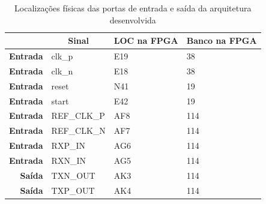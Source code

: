 \documentclass[11pt,a4paper]{article}
\begin{document}
	\begin{table}[h!]
		\centering
		\caption[Localizações físicas das portas de entrada e saída da arquitetura desenvolvida]{Localizações físicas das portas de entrada e saída da arquitetura desenvolvida}
		\label{table:loc_planD_simples}
		\begin{tabular}{rlll}
			\hline
			\multicolumn{1}{l}{}                  & \multicolumn{1}{c}{\textbf{Sinal}} & \multicolumn{1}{c}{\textbf{LOC na FPGA}} & \multicolumn{1}{c}{\textbf{Banco na FPGA}} \\ \hline
			\multicolumn{1}{r|}{\textbf{Entrada}} & clk\_p                             & E19                                      & 38                                         \\
			\multicolumn{1}{r|}{\textbf{Entrada}} & clk\_n                             & E18                                      & 38                                         \\
			\multicolumn{1}{r|}{\textbf{Entrada}} & reset                              & N41                                      & 19                                         \\
			\multicolumn{1}{r|}{\textbf{Entrada}} & start                              & E42                                      & 19                                         \\
			\multicolumn{1}{r|}{\textbf{Entrada}} & REF\_CLK\_P                        & AF8                                      & 114                                        \\
			\multicolumn{1}{r|}{\textbf{Entrada}} & REF\_CLK\_N                        & AF7                                      & 114                                        \\
			\multicolumn{1}{r|}{\textbf{Entrada}} & RXP\_IN                            & AG6                                      & 114                                        \\
			\multicolumn{1}{r|}{\textbf{Entrada}} & RXN\_IN                            & AG5                                      & 114                                        \\
			\multicolumn{1}{r|}{\textbf{Saída}}   & TXN\_OUT                           & AK3                                      & 114                                        \\
			\multicolumn{1}{r|}{\textbf{Saída}}   & TXP\_OUT                           & AK4                                      & 114                                        \\

\end{tabular}
\end{table}
\end{document}
